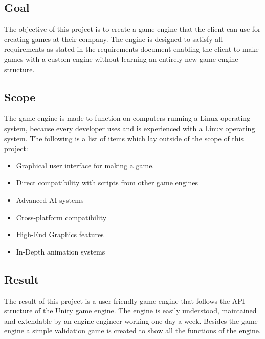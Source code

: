 \documentclass{article} %
\begin{document}
\subsection{Goal}
The objective of this project is to create a game engine that the client can use for creating games at their company.
The engine is designed to satisfy all requirements as stated in the requirements document enabling the client to make games with a custom engine without learning an entirely new game engine structure.

\subsection{Scope}
The game engine is made to function on computers running a Linux operating system, because every developer uses and is experienced with a Linux operating system.
\newline\newline
The following is a list of items which lay outside of the scope of this project:
\begin{itemize}
    \item Graphical user interface for making a game.
    \item Direct compatibility with scripts from other game engines
    \item Advanced AI systems
    \item Cross-platform compatibility
    \item High-End Graphics features
    \item In-Depth animation systems
\end{itemize}

\subsection{Result}
The result of this project is a user-friendly game engine that follows the API structure of the Unity game engine.
The engine is easily understood, maintained and extendable by an engine engineer working one day a week.
\newline\newline
Besides the game engine a simple validation game is created to show all the functions of the engine.
\newpage
\end{document}
